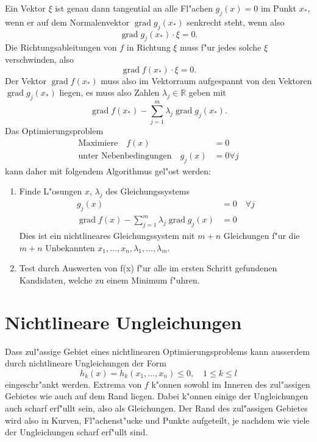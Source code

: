 Ein Vektor $\xi$ ist genau dann tangential an alle Fl"achen $g_j(x)=0$
im Punkt $x_*$,
wenn er auf dem Normalenvektor $\operatorname{grad}g_j(x_*)$
senkrecht steht, wenn also
\begin{equation}
\operatorname{grad}g_j(x_*)\cdot \xi=0.
\end{equation}
Die Richtungsableitungen von $f$ in Richtung $\xi$ muss f"ur jedes solche
$\xi$ verschwinden, also
\begin{equation}
\operatorname{grad}f(x_*)\cdot\xi = 0.
\end{equation}
Der Vektor $\operatorname{grad}f(x_*)$ muss also im Vektorraum
aufgespannt von den Vektoren $\operatorname{grad}g_j(x_*)$ liegen,
es muss also Zahlen $\lambda_j\in\mathbb R$ geben mit
\begin{equation}
\operatorname{grad}f(x_*)-\sum_{j=1}^m\lambda_j \operatorname{grad}g_j(x_*).
\end{equation}
Das Optimierungsproblem 
\begin{align*}
\text{Maximiere}\quad f(x)&=0\\
\text{unter Nebenbedingungen}\quad g_j(x)&=0\forall j
\end{align*}
kann daher mit folgendem Algorithmus gel"ost werden:
\begin{enumerate}
\item Finde L"osungen $x$, $\lambda_j$ des Gleichungssystems
\begin{align*}
g_j(x)&=0\quad\forall j\\
\operatorname{grad}f(x)-\sum_{j=1}^m\lambda_j\operatorname{grad}g_j(x)&=0
\end{align*}
Dies ist ein nichtlineares Gleichungssystem mit $m+n$ Gleichungen 
f"ur die $m+n$ Unbekannten $x_1,\dots,x_n,\lambda_1,\dots,\lambda_m$.
\item 
Test durch Auswerten von f(x) f"ur alle im ersten Schritt gefundenen
Kandidaten, welche zu einem Minimum f"uhren.
\end{enumerate}

\section{Nichtlineare Ungleichungen}
Dass zul"assige Gebiet eines
nichtlinearen Optimierungsproblems kann ausserdem durch 
nichtlineare Ungleichungen der Form
\begin{equation}
h_k(x) = h_k(x_1,\dots,x_n) \le 0,\quad 1 \le k\le l
\end{equation}
eingeschr"ankt werden.
Extrema von $f$ k"onnen sowohl im Inneren des zul"assigen Gebietes
wie auch auf dem Rand liegen.
Dabei k"onnen einige der Ungleichungen auch scharf erf"ullt
sein, also als Gleichungen. Der Rand des zul"assigen Gebietes
wird also in Kurven, Fl"achenst"ucke und Punkte aufgeteilt, je nachdem
wie viele der Ungleichungen scharf erf"ullt sind.

